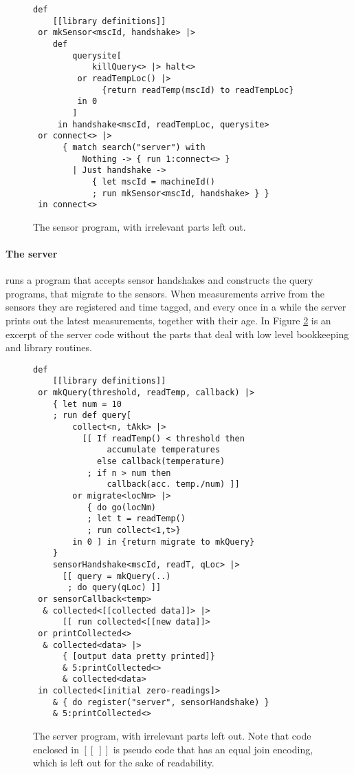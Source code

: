 \begin{figure}[!h]
\begin{minipage}{0.97\textwidth}
\begin{verbatim}
def
    [[library definitions]]
 or mkSensor<mscId, handshake> |>
    def
        querysite[
            killQuery<> |> halt<>
         or readTempLoc() |>
              {return readTemp(mscId) to readTempLoc}
         in 0
        ]
     in handshake<mscId, readTempLoc, querysite>
 or connect<> |>
      { match search("server") with
          Nothing -> { run 1:connect<> }
        | Just handshake ->
            { let mscId = machineId()
            ; run mkSensor<mscId, handshake> } }
 in connect<>
\end{verbatim}
\end{minipage}
\caption{The sensor program, with irrelevant parts left out.}\label{fig:sensor-prog}
\end{figure}

\paragraph{The server} runs a program that accepts sensor handshakes and
constructs the query programs, that migrate to the sensors.  When measurements
arrive from the sensors they are registered and time tagged, and every once in
a while the server prints out the latest measurements, together with their age.
In Figure \ref{fig:server-prog} is an excerpt of the server code without the
parts that deal with low level bookkeeping and library routines.
\begin{figure}[!h]
\begin{minipage}{0.97\textwidth}
\begin{verbatim}
def
    [[library definitions]]
 or mkQuery(threshold, readTemp, callback) |>
    { let num = 10
    ; run def query[
        collect<n, tAkk> |>
          [[ If readTemp() < threshold then
               accumulate temperatures
             else callback(temperature)
           ; if n > num then
               callback(acc. temp./num) ]]
        or migrate<locNm> |>
           { do go(locNm)
           ; let t = readTemp()
           ; run collect<1,t>}
        in 0 ] in {return migrate to mkQuery}
    }
    sensorHandshake<mscId, readT, qLoc> |>
      [[ query = mkQuery(..)
       ; do query(qLoc) ]]
 or sensorCallback<temp>
  & collected<[[collected data]]> |>
      [[ run collected<[[new data]]>
 or printCollected<>
  & collected<data> |>
      { [output data pretty printed]}
      & 5:printCollected<>
      & collected<data>
 in collected<[initial zero-readings]>
    & { do register("server", sensorHandshake) }
    & 5:printCollected<>
\end{verbatim}
\end{minipage}
\caption{The server program, with irrelevant parts left out. Note that code
enclosed in $\left[ \left[\ \right] \right]$ is pseudo code that has an equal
join encoding, which is left out for the sake of readability.}
\label{fig:server-prog}
\end{figure}

